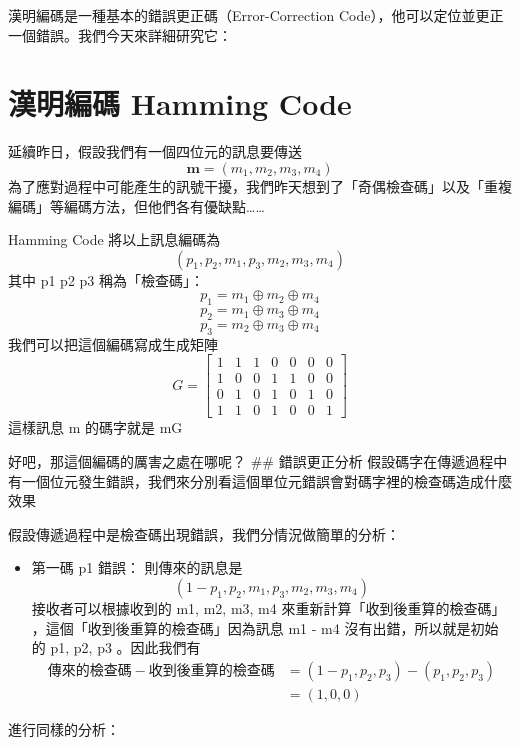 \documentclass[
]{article}
\author{}
\date{}
\providecommand{\tightlist}{%
  \setlength{\itemsep}{0pt}\setlength{\parskip}{0pt}}
\begin{document}
漢明編碼是一種基本的錯誤更正碼（Error-Correction
Code），他可以定位並更正一個錯誤。我們今天來詳細研究它：

\hypertarget{ux6f22ux660eux7de8ux78bc-hamming-code}{%
\section{漢明編碼 Hamming
Code}\label{ux6f22ux660eux7de8ux78bc-hamming-code}}

延續昨日，假設我們有一個四位元的訊息要傳送 \[
\mathbf{m}=(m_{1},m_{2},m_{3},m_{4})
\]
為了應對過程中可能產生的訊號干擾，我們昨天想到了「奇偶檢查碼」以及「重複編碼」等編碼方法，但他們各有優缺點\ldots\ldots{}

Hamming Code 將以上訊息編碼為 \[
(p_{1},p_{2},m_{1},p_{3},m_{2},m_{3},m_{4})
\] 其中 p1 p2 p3 稱為「檢查碼」： \[
p_{1} = m_{1}\oplus m_{2}\oplus m_{4}
\] \[
p_{2} = m_{1}\oplus m_{3}\oplus m_{4}
\] \[
p_{3} = m_{2}\oplus m_{3}\oplus m_{4}
\] 我們可以把這個編碼寫成生成矩陣 \[G =
\begin{bmatrix}
1  & 1 & 1 & 0 & 0 & 0 & 0\\
1  & 0 & 0 & 1 & 1 & 0 & 0\\
0  & 1 & 0 & 1 & 0 & 1 & 0\\
1  & 1 & 0 & 1 & 0 & 0 & 1
\end{bmatrix}
\] 這樣訊息 m 的碼字就是 mG

好吧，那這個編碼的厲害之處在哪呢？ \#\# 錯誤更正分析
假設碼字在傳遞過程中有一個位元發生錯誤，我們來分別看這個單位元錯誤會對碼字裡的檢查碼造成什麼效果

假設傳遞過程中是檢查碼出現錯誤，我們分情況做簡單的分析：

\begin{itemize}
\tightlist
\item
  第一碼 p1 錯誤： 則傳來的訊息是 \[
  (1-p_{1},p_{2},m_{1},p_{3},m_{2},m_{3},m_{4})
  \] 接收者可以根據收到的 m1, m2, m3, m4
  來重新計算「收到後重算的檢查碼」 ，這個「收到後重算的檢查碼」因為訊息
  m1 - m4 沒有出錯，所以就是初始的 p1, p2, p3 。因此我們有 \[
  \begin{aligned}
  傳來的檢查碼 - 收到後重算的檢查碼 &= (1-p_{1},p_{2},p_{3}) - (p_{1},p_{2},p_{3}) \\
  &= (1,0,0)
  \end{aligned}
  \]
\end{itemize}

進行同樣的分析：
\end{document}
